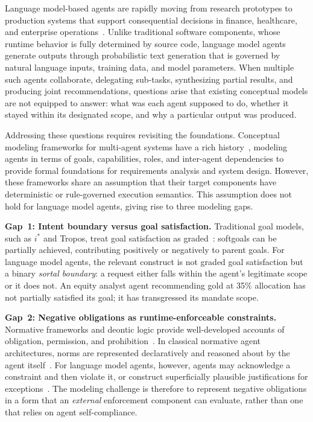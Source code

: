 \documentclass[runningheads]{llncs}
\begin{document}
Language model-based agents are rapidly moving from research prototypes
to production systems that support consequential decisions in finance,
healthcare, and enterprise operations~\cite{wang2024survey,xi2023rise}.
Unlike traditional software components, whose runtime behavior is fully
determined by source code, language model agents generate outputs through
probabilistic text generation that is governed by natural language inputs,
training data, and model parameters. When multiple such agents collaborate,
delegating sub-tasks, synthesizing partial results, and producing joint
recommendations, questions arise that existing
conceptual models are not equipped to answer: what was each agent
supposed to do, whether it stayed within its designated scope, and why
a particular output was produced.

Addressing these questions requires revisiting the foundations. Conceptual modeling frameworks for multi-agent systems have a rich
history~\cite{yu2011social,bresciani2004tropos,wooldridge2000gaia}, modeling agents in terms of goals, capabilities, roles, and inter-agent
dependencies to provide formal foundations for requirements analysis and
system design. However, these frameworks share an assumption that their
target components have deterministic or rule-governed execution semantics.
This assumption does not hold for language model agents, giving rise to
three modeling gaps.

\medskip
\noindent\textbf{Gap~1: Intent boundary versus goal satisfaction.}
Traditional goal models, such as $i^*$ and Tropos, treat goal
satisfaction as graded~\cite{yu2011social}: softgoals can be partially
achieved, contributing positively or negatively to parent goals. For
language model agents, the relevant construct is not graded goal
satisfaction but a binary \emph{sortal boundary}: a request either falls
within the agent's legitimate scope or it does not. An equity analyst
agent recommending gold at 35\% allocation has not partially satisfied
its goal; it has transgressed its mandate scope.

\medskip
\noindent\textbf{Gap~2: Negative obligations as runtime-enforceable
constraints.} Normative frameworks and deontic logic provide
well-developed accounts of obligation, permission, and
prohibition~\cite{vonwright1951essay,governatori2005meeting,boella2006introduction}. In classical normative agent architectures,
norms are represented declaratively and reasoned about by the agent
itself~\cite{dignum1999autonomous}. For language model agents, however,
agents may acknowledge a constraint and then violate it, or construct
superficially plausible justifications for
exceptions~\cite{huang2023selfcorrect}. The modeling challenge is
therefore to represent negative obligations in a form that an
\emph{external} enforcement component can evaluate, rather than one
that relies on agent self-compliance.
\end{document}
